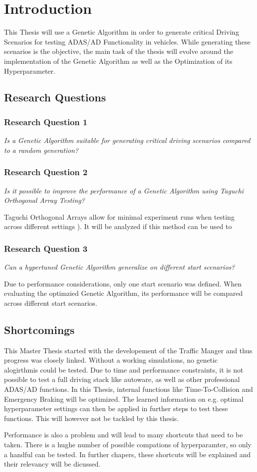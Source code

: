 \chapter{Introduction}
This Thesis will use a Genetic Algorithm in order to generate critical Driving Scenarios for testing ADAS/AD Functionality in vehicles.
While generating these scenarios is the objective, the main task of the thesis will evolve around the implementation of the Genetic Algorithm as well as the Optimization of its Hyperparameter.


\section{Research Questions}
\subsection{Research Question 1}
\textit{Is a Genetic Algorithm suitable for generating critical driving scenarios compared to a random generation?}

\subsection{Research Question 2}
\textit{Is it possible to improve the performance of a Genetic Algorithm using Taguchi Orthogonal Array Testing?}

Taguchi Orthogonal Arrays allow for minimal experiment runs when testing across different settings \cite{roy_primer_1990}). It will be analyzed if this method can be used to 

\subsection{Research Question 3}
\textit{Can a hypertuned Genetic Algorithm generalize on different start scenarios?}

Due to performance considerations, only one start scenario was defined. When evaluating the optimzied Genetic Algorithm, its performance will be compared across different start scenarios.


\section{Shortcomings}
This Master Thesis started with the developement of the Traffic Manger and thus progress was closely linked. Without a working simulations, no genetic alogirthmis could be tested. Due to time and performance constraints, it is not possible to test a full driving stack like autoware, as well as other professional ADAS/AD functions.
In this Thesis, internal functions like Time-To-Collision and Emergency Braking will be optimized. The learned  information on e.g. optimal hyperparameter settings can then be applied in further steps to test these functions. This will however not be tackled by this thesis.

Performance is also a problem and will lead to many shortcuts that need to be taken. There is a hughe number of possible compations of hyperparamter, so only a handful can be tested. In further chapers, these shortcuts will be explained and their relevancy will be dicussed.
